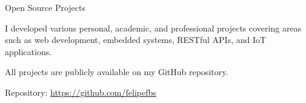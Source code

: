 
\begin{cventries}
  \cventry
  {} %
  {Open Source Projects} %
  {} %
  {} %
  {
    \begin{cvitems}
      \item {I developed various personal, academic, and professional projects covering areas such as web development, embedded systems, RESTful APIs, and IoT applications.}
      \item {All projects are publicly available on my GitHub repository.}
      \item {Repository: \url{https://github.com/felipefbs}}
    \end{cvitems}
  }
\end{cventries}
